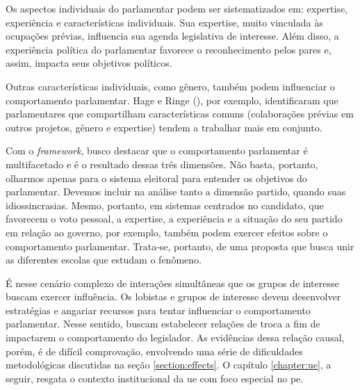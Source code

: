     Os aspectos individuais do parlamentar podem ser sistematizados em: expertise, experiência e características individuais. Sua expertise, muito vinculada às ocupações prévias, influencia sua agenda legislativa de interesse. Além disso, a experiência política do parlamentar favorece o reconhecimento pelos pares e, assim, impacta seus objetivos políticos.

    Outras características individuais, como gênero, também podem influenciar o comportamento parlamentar. Hage e Ringe (\citeyear{hage2024works}), por exemplo, identificaram que parlamentares que compartilham características comuns (colaborações prévias em outros projetos, gênero e expertise) tendem a trabalhar mais em conjunto. 

    Com o \textit{framework}, busco destacar que o comportamento parlamentar é multifacetado e é o resultado dessas três dimensões. Não basta, portanto, olharmos apenas para o sistema eleitoral para entender os objetivos do parlamentar. Devemos incluir na análise tanto a dimensão partido, quando suas idiossincrasias. Mesmo, portanto, em sistemas centrados no candidato, que favorecem o voto pessoal, a expertise, a experiência e a situação do seu partido em relação ao governo,  por exemplo, também podem exercer efeitos sobre o comportamento parlamentar. Trata-se, portanto, de uma proposta que busca unir as diferentes escolas que estudam o fenômeno.
    

É nesse cenário complexo de interações simultâneas que os grupos de interesse buscam exercer influência. Os lobistas e grupos de interesse devem desenvolver estratégias e angariar recursos para tentar influenciar o comportamento parlamentar. Nesse sentido, buscam estabelecer relações de troca \cite{huwyler_no_2023} a fim de impactarem o comportamento do legislador. As evidências dessa relação causal, porém, é de difícil comprovação, envolvendo uma série de dificuldades metodológicas discutidas na seção \ref{section:effects}. O capítulo \ref{chapter:ue}, a seguir, resgata o contexto institucional da \acrshort{ue} com foco especial no \acrshort{pe}.
